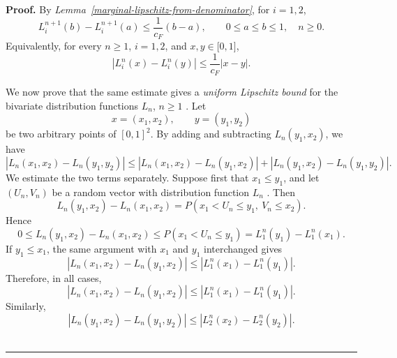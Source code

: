 \documentclass[onecolumn]{article}
\newenvironment{proof}[1][Proof]{\noindent\textbf{#1.} }{\ \rule{0.5em}{0.5em}}
\begin{document}
\begin{proof}
By \textit{Lemma~\ref{marginal-lipschitz-from-denominator}}, for $i=1,2$, 
\begin{equation}
L_{i}^{n+1}(b)-L_{i}^{n+1}(a)\leq \frac{1}{c_{F}}(b-a),\qquad 0\leq a\leq
b\leq 1,\quad n\geq 0.  \label{5001}
\end{equation}%
Equivalently, for every $n\geq 1$, $i=1,2$, and $x,y\in \lbrack 0,1]$, 
\begin{equation}
|L_{i}^{n}(x)-L_{i}^{n}(y)|\leq \frac{1}{c_{F}}|x-y|.  \label{5002}
\end{equation}

\noindent We now prove that the same estimate gives a \textit{uniform
Lipschitz bound} for the bivariate distribution functions $L_{n}$, $n\geq 1$%
. Let 
\begin{equation}
x=(x_{1},x_{2}),\qquad y=(y_{1},y_{2})  \label{5003}
\end{equation}%
be two arbitrary points of $[0,1]^{2}$. By adding and subtracting $%
L_{n}(y_{1},x_{2})$, we have 
\begin{equation}
|L_{n}(x_{1},x_{2})-L_{n}(y_{1},y_{2})|\leq
|L_{n}(x_{1},x_{2})-L_{n}(y_{1},x_{2})|+|L_{n}(y_{1},x_{2})-L_{n}(y_{1},y_{2})|.
\label{5004}
\end{equation}%
We estimate the two terms separately. Suppose first that $x_{1}\leq y_{1}$,
and let $(U_{n},V_{n})$ be a random vector with distribution function $L_{n}$%
. Then 
\begin{equation}
L_{n}(y_{1},x_{2})-L_{n}(x_{1},x_{2})=P(x_{1}<U_{n}\leq y_{1},\ V_{n}\leq
x_{2}).  \label{5005}
\end{equation}%
Hence 
\begin{equation}
0\leq L_{n}(y_{1},x_{2})-L_{n}(x_{1},x_{2})\leq P(x_{1}<U_{n}\leq
y_{1})=L_{1}^{n}(y_{1})-L_{1}^{n}(x_{1}).  \label{5006}
\end{equation}%
If $y_{1}\leq x_{1}$, the same argument with $x_{1}$ and $y_{1}$
interchanged gives 
\begin{equation}
|L_{n}(x_{1},x_{2})-L_{n}(y_{1},x_{2})|\leq
|L_{1}^{n}(x_{1})-L_{1}^{n}(y_{1})|.  \label{5007}
\end{equation}%
Therefore, in all cases, 
\begin{equation}
|L_{n}(x_{1},x_{2})-L_{n}(y_{1},x_{2})|\leq
|L_{1}^{n}(x_{1})-L_{1}^{n}(y_{1})|.  \label{5008}
\end{equation}%
Similarly, 
\begin{equation}
|L_{n}(y_{1},x_{2})-L_{n}(y_{1},y_{2})|\leq
|L_{2}^{n}(x_{2})-L_{2}^{n}(y_{2})|.  \label{5009}

\end{equation}
\end{proof}
\end{document}
